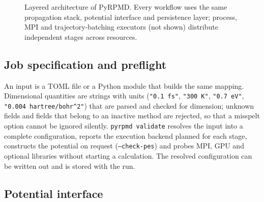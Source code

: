 \documentclass[preprint,12pt]{elsarticle}
\newcommand{\code}[1]{\texttt{#1}}
\begin{document}
\begin{figure}[!htbp]
\caption{Layered architecture of PyRPMD. Every workflow uses the same propagation stack, potential interface and persistence layer; process, MPI and trajectory-batching executors (not shown) distribute independent stages across resources.}
\label{fig:architecture}
\end{figure}

\subsection{Job specification and preflight}

An input is a TOML file or a Python module that builds the same mapping. Dimensional quantities are strings with units (\code{"0.1 fs"}, \code{"300 K"}, \code{"0.7 eV"}, \code{"0.004 hartree/bohr\^{}2"}) that are parsed and checked for dimension; unknown fields and fields that belong to an inactive method are rejected, so that a misspelt option cannot be ignored silently. \code{pyrpmd validate} resolves the input into a complete configuration, reports the execution backend planned for each stage, constructs the potential on request (\code{--check-pes}) and probes MPI, GPU and optional libraries without starting a calculation. The resolved configuration can be written out and is stored with the run.

\subsection{Potential interface}
\end{document}
